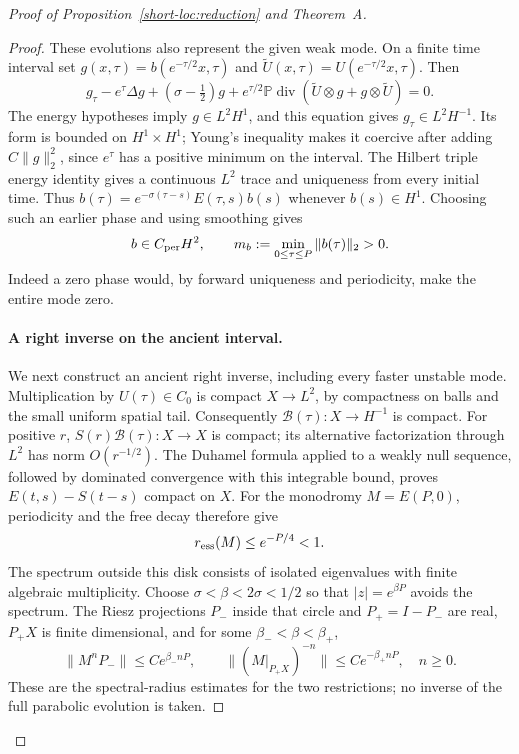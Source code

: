 \begin{proof}[Proof of Proposition~\ref{short-loc:reduction} and Theorem~A]
\begin{proof}
These evolutions also represent the given weak mode. On a finite time
interval set $g(x,\tau)=b(e^{-\tau/2}x,\tau)$ and
$\widetilde U(x,\tau)=U(e^{-\tau/2}x,\tau)$. Then
\[
 g_\tau-e^\tau\Delta g+(\sigma-\tfrac12)g
 +e^{\tau/2}\mathbb P\operatorname{div}
       (\widetilde U\otimes g+g\otimes\widetilde U)=0.
\]
The energy hypotheses imply $g\in L^2H^1$, and this equation gives
$g_\tau\in L^2H^{-1}$. Its form is bounded on $H^1\times H^1$;
Young's inequality makes it coercive after adding $C\|g\|_2^2$,
since $e^\tau$ has a positive minimum on the interval. The Hilbert
triple energy identity gives a continuous $L^2$ trace and uniqueness
from every initial time. Thus
$b(\tau)=e^{-\sigma(\tau-s)}E(\tau,s)b(s)$ whenever $b(s)\in H^1$.
Choosing such an earlier phase and using smoothing gives
\begin{equation}\label{short-loc:mode-regularity}
 b\in C_{\rm per}H^2,\qquad
 m_b:=\min_{0\le\tau\le P}\|b(\tau)\|_2>0.
\end{equation}
Indeed a zero phase would, by forward uniqueness and periodicity,
make the entire mode zero.

\paragraph{A right inverse on the ancient interval.}
We next construct an ancient right inverse, including every faster
unstable mode. Multiplication by $U(\tau)\in C_0$ is compact
$X\to L^2$, by compactness on balls and the small uniform spatial tail.
Consequently $\mathcal B(\tau):X\to H^{-1}$ is compact.
For positive $r$, $S(r)\mathcal B(\tau):X\to X$ is compact; its
alternative factorization through $L^2$ has norm $O(r^{-1/2})$.
The Duhamel formula applied to a weakly null sequence, followed by
dominated convergence with this integrable bound, proves
$E(t,s)-S(t-s)$ compact on $X$. For the monodromy
$M=E(P,0)$, periodicity and the free decay therefore give
\[
 r_{\rm ess}(M)\le e^{-P/4}<1.
\]
The spectrum outside this disk consists of isolated eigenvalues with
finite algebraic multiplicity. Choose
$\sigma<\beta<2\sigma<1/2$ so that $|z|=e^{\beta P}$ avoids the
spectrum. The Riesz projections $P_-$ inside that circle and
$P_+=I-P_-$ are real, $P_+X$ is finite dimensional, and for some
$\beta_-<\beta<\beta_+$,
\[
 \|M^nP_-\|\le Ce^{\beta_-nP},\qquad
 \|(M|_{P_+X})^{-n}\|\le Ce^{-\beta_+nP},\quad n\ge0.
\]
These are the spectral-radius estimates for the two restrictions;
no inverse of the full parabolic evolution is taken.


\end{proof}
\end{proof}
